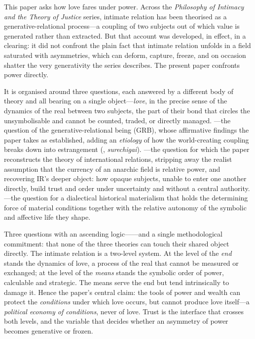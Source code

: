 This paper asks how love fares under power. Across the \emph{Philosophy of Intimacy and the Theory of Justice} series, intimate relation has been theorised as a generative-relational process---a coupling of two subjects out of which value is generated rather than extracted. But that account was developed, in effect, in a clearing: it did not confront the plain fact that intimate relation unfolds in a field saturated with asymmetries, which can deform, capture, freeze, and on occasion shatter the very generativity the series describes. The present paper confronts power directly.

It is organised around three questions, each answered by a different body of theory and all bearing on a single object---\emph{love}, in the precise sense of the dynamics of the real between two subjects, the part of their bond that circles the unsymbolisable and cannot be counted, traded, or directly managed. ---the question of the generative-relational being (GRB), whose affirmative findings the paper takes as established, adding an \emph{etiology} of how the world-creating coupling breaks down into estrangement (, \emph{surechigai}). ---the question for which the paper reconstructs the theory of international relations, stripping away the realist assumption that the currency of an anarchic field is relative power, and recovering IR's deeper object: how opaque subjects, unable to enter one another directly, build trust and order under uncertainty and without a central authority. ---the question for a dialectical historical materialism that holds the determining force of material conditions together with the relative autonomy of the symbolic and affective life they shape.

Three questions with an ascending logic------and a single methodological commitment: that none of the three theories can touch their shared object directly. The intimate relation is a two-level system. At the level of the \emph{end} stands the dynamics of love, a process of the real that cannot be measured or exchanged; at the level of the \emph{means} stands the symbolic order of power, calculable and strategic. The means serve the end but tend intrinsically to damage it. Hence the paper's central claim: the tools of power and wealth can protect the \emph{conditions} under which love occurs, but cannot produce love itself---a \emph{political economy of conditions}, never of love. Trust is the interface that crosses both levels, and the variable that decides whether an asymmetry of power becomes generative or frozen.

